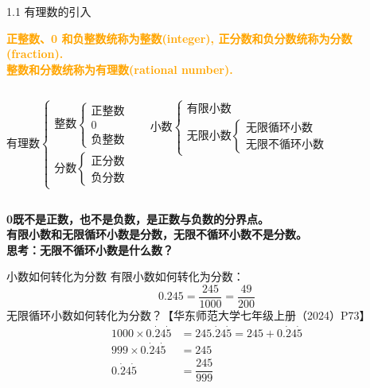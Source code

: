 \documentclass[aspectratio=169]{ctexbeamer} %
\date{\today}
\begin{document}
\begin{frame}{1.1 有理数的引入}
\begin{definition}
\textbf{\textcolor{orange}{正整数、0 和负整数统称为整数(integer), 正分数和负分数统称为分数(fraction).\\
整数和分数统称为有理数(rational number).}}
\end{definition}
\begin{columns}
\[
\mbox{有理数}\begin{cases}
\mbox{整数} \begin{cases}
    \mbox{正整数} \\
    0 \\
    \mbox{负整数}
    \end{cases} \\
\mbox{分数}  \begin{cases}
    \mbox{正分数} \\
    \mbox{负分数}
    \end{cases}
\end{cases}
\]

\[
\mbox{小数}\begin{cases}
\mbox{有限小数} \\
\mbox{无限小数} \begin{cases} 
\mbox{无限循环小数} \\
\mbox{无限不循环小数}
\end{cases}
\end{cases}
\]

\end{columns}
\vspace{12pt}
\alert{\textbf{0既不是正数，也不是负数，是正数与负数的分界点。}} \\
\alert{\textbf{有限小数和无限循环小数是分数，无限不循环小数不是分数。}} \\
\textbf{思考：无限不循环小数是什么数？}
\end{frame}

\begin{frame}{小数如何转化为分数}
有限小数如何转化为分数：\\
\[0.245=\dfrac{245}{1000}=\dfrac{49}{200}
\]
无限循环小数如何转化为分数？【华东师范大学七年级上册（2024）P73】
\begin{align*}
1000\times 0.\dot{2}4\dot{5} &= 245.\dot{2}4\dot{5} = 245 + 0.\dot{2}4\dot{5} \\
999 \times 0.\dot{2}4\dot{5} &= 245 \\
0.\dot{2}4\dot{5} &= \dfrac{245}{999}
\end{align*}
\end{frame}
\end{document}

